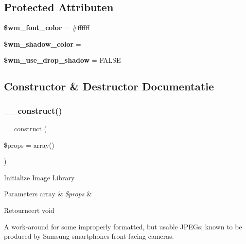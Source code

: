 \subsection*{Protected Attributen}
\begin{DoxyCompactItemize}
\item 
\mbox{\label{class_c_i___image__lib_ae9498442637ff2466d4426af45f68c6b}} 
{\bfseries \$wm\+\_\+font\+\_\+color} = \textquotesingle{}\#ffffff\textquotesingle{}
\item 
\mbox{\label{class_c_i___image__lib_aca292b49514fe3238440675c4b2642ca}} 
{\bfseries \$wm\+\_\+shadow\+\_\+color} = \textquotesingle{}\textquotesingle{}
\item 
\mbox{\label{class_c_i___image__lib_a49b77ed476cebe5f357705e7a9c4ccce}} 
{\bfseries \$wm\+\_\+use\+\_\+drop\+\_\+shadow} = F\+A\+L\+SE
\end{DoxyCompactItemize}


\subsection{Constructor \& Destructor Documentatie}
\mbox{\label{class_c_i___image__lib_a563262d396a1cef6153c9998d77bb548}} 
\subsubsection{\texorpdfstring{\_\_construct()}{\_\_construct()}}
{\footnotesize\ttfamily \+\_\+\+\_\+construct (\begin{DoxyParamCaption}\item[{}]{\$props = {\ttfamily array()} }\end{DoxyParamCaption})}

Initialize Image Library


\begin{DoxyParams}[1]{Parameters}
array & {\em \$props} & \\
\hline
\end{DoxyParams}
\begin{DoxyReturn}{Retourneert}
void 
\end{DoxyReturn}
A work-\/around for some improperly formatted, but usable J\+P\+E\+Gs; known to be produced by Samsung smartphones\textquotesingle{} front-\/facing cameras.

